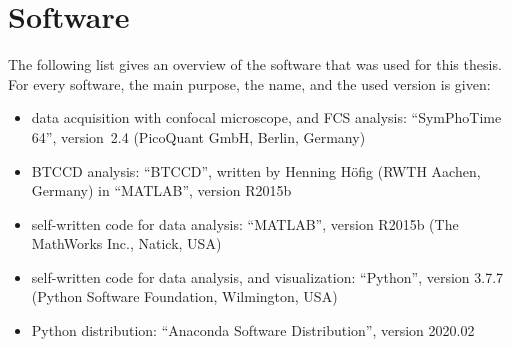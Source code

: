 \section{Software}

The following list gives an overview of the software that was used for this thesis. For every software, the main purpose, the name, and the used version is given:
\begin{itemize}
	\item data acquisition with confocal microscope, and \gls{FCS} analysis: \enquote{SymPhoTime 64}, version~2.4 (PicoQuant GmbH, Berlin, Germany)
	\item \gls{BTCCD} analysis: \enquote{BTCCD}, written by Henning Höfig (RWTH Aachen, Germany) in \enquote{MATLAB}, version R2015b \parencite{Hoefig2019}
	\item self-written code for data analysis: \enquote{MATLAB}, version R2015b (The MathWorks Inc., Natick, USA)
	\item self-written code for data analysis, and visualization: \enquote{Python}, version 3.7.7 (Python Software Foundation, Wilmington, USA)
	\item Python distribution: \enquote{Anaconda Software Distribution}, version 2020.02 \cite{Anaconda}
\end{itemize}
